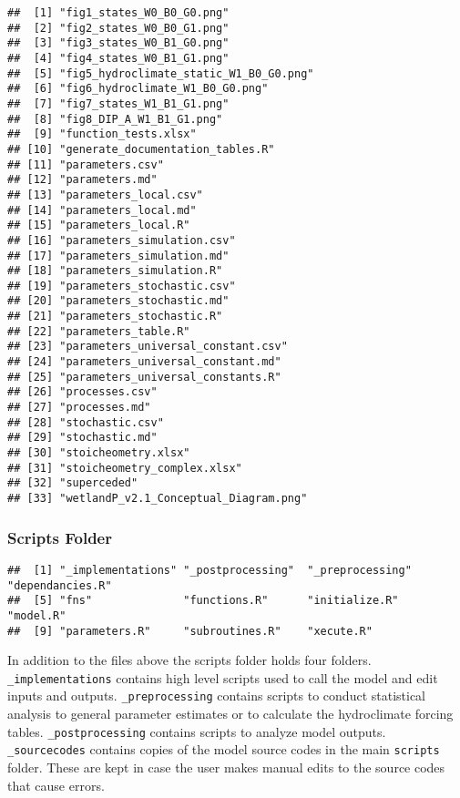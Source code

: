 \documentclass[
]{article}
\begin{document}
\begin{verbatim}
##  [1] "fig1_states_W0_B0_G0.png"             
##  [2] "fig2_states_W0_B0_G1.png"             
##  [3] "fig3_states_W0_B1_G0.png"             
##  [4] "fig4_states_W0_B1_G1.png"             
##  [5] "fig5_hydroclimate_static_W1_B0_G0.png"
##  [6] "fig6_hydroclimate_W1_B0_G0.png"       
##  [7] "fig7_states_W1_B1_G1.png"             
##  [8] "fig8_DIP_A_W1_B1_G1.png"              
##  [9] "function_tests.xlsx"                  
## [10] "generate_documentation_tables.R"      
## [11] "parameters.csv"                       
## [12] "parameters.md"                        
## [13] "parameters_local.csv"                 
## [14] "parameters_local.md"                  
## [15] "parameters_local.R"                   
## [16] "parameters_simulation.csv"            
## [17] "parameters_simulation.md"             
## [18] "parameters_simulation.R"              
## [19] "parameters_stochastic.csv"            
## [20] "parameters_stochastic.md"             
## [21] "parameters_stochastic.R"              
## [22] "parameters_table.R"                   
## [23] "parameters_universal_constant.csv"    
## [24] "parameters_universal_constant.md"     
## [25] "parameters_universal_constants.R"     
## [26] "processes.csv"                        
## [27] "processes.md"                         
## [28] "stochastic.csv"                       
## [29] "stochastic.md"                        
## [30] "stoicheometry.xlsx"                   
## [31] "stoicheometry_complex.xlsx"           
## [32] "superceded"                           
## [33] "wetlandP_v2.1_Conceptual_Diagram.png"
\end{verbatim}

\hypertarget{scripts-folder}{%
\subsubsection{Scripts Folder}\label{scripts-folder}}

\begin{verbatim}
##  [1] "_implementations" "_postprocessing"  "_preprocessing"   "dependancies.R"  
##  [5] "fns"              "functions.R"      "initialize.R"     "model.R"         
##  [9] "parameters.R"     "subroutines.R"    "xecute.R"
\end{verbatim}

In addition to the files above the scripts folder holds four folders.
\texttt{\_implementations} contains high level scripts used to call the
model and edit inputs and outputs. \texttt{\_preprocessing} contains
scripts to conduct statistical analysis to general parameter estimates
or to calculate the hydroclimate forcing tables.
\texttt{\_postprocessing} contains scripts to analyze model outputs.
\texttt{\_sourcecodes} contains copies of the model source codes in the
main \texttt{scripts} folder. These are kept in case the user makes
manual edits to the source codes that cause errors.
\end{document}
